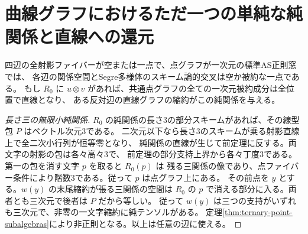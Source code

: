 \section{曲線グラフにおけるただ一つの単純な純関係と直線への還元}
\label{sec:curve-graph-single-pure}
\begin{theorem}\label{thm:curve-graph-single-pure}
四辺の全射影ファイバーが空または一点で、点グラフが一次元の標準AS正則窓では、
各辺の関係空間とSegre多様体のスキーム論的交叉は空か被約な一点である。
もし $R_0$ に $u\otimes v$ があれば、共通点グラフの全ての一次元被約成分は全位置で直線となり、
ある反対辺の直線グラフの縮約がこの純関係を与える。
\end{theorem}
\begin{proof}[長さ三の無限小純関係]
$R_0$ の純関係の長さ3の部分スキームがあれば、その線型包 $P$ はベクトル次元3である。
二次元以下なら長さ3のスキームが乗る射影直線上で全二次小行列が恒等零となり、
純関係の直線が生じて前定理に反する。両文字の射影の包は各々高々3で、
前定理の部分支持上界から各々丁度3である。第一の包を消す文字 $p$ を取ると $R_0(p)$ は
残る三関係の像であり、点ファイバー条件により階数3である。従って $p$ は点グラフ上にある。
その前点を $y$ とする。$w(y)$ の末尾縮約が張る三関係の空間は $R_0$ の
$p$ で消える部分に入る。両者とも三次元で後者は $P$ だから等しい。
従って $w(y)$ は三つの支持がいずれも三次元で、非零の一文字縮約に純テンソルがある。
定理\ref{thm:ternary-point-subalgebras}により非正則となる。以上は任意の辺に使える。
\end{proof}
